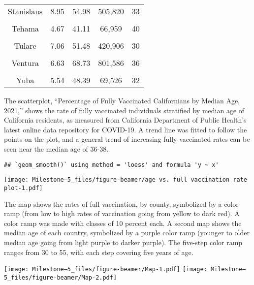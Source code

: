 \documentclass[
  ignorenonframetext,
]{beamer}
\begin{document}
\begin{frame}
\begin{table}
{\begin{tabular}[t]{ccccc}
Stanislaus & 8.95 & 54.98 & 505,820 & 33\\
\addlinespace
\cellcolor{gray!6}{Sutter} & \cellcolor{gray!6}{6.46} & \cellcolor{gray!6}{57.47} & \cellcolor{gray!6}{90,595} & \cellcolor{gray!6}{35}\\
Tehama & 4.67 & 41.11 & 66,959 & 40\\
\cellcolor{gray!6}{Trinity} & \cellcolor{gray!6}{6.01} & \cellcolor{gray!6}{42.55} & \cellcolor{gray!6}{12,260} & \cellcolor{gray!6}{49}\\
Tulare & 7.06 & 51.48 & 420,906 & 30\\
\cellcolor{gray!6}{Tuolumne} & \cellcolor{gray!6}{6.96} & \cellcolor{gray!6}{50.01} & \cellcolor{gray!6}{52,564} & \cellcolor{gray!6}{47}\\
\addlinespace
Ventura & 6.63 & 68.73 & 801,586 & 36\\
\cellcolor{gray!6}{Yolo} & \cellcolor{gray!6}{8.69} & \cellcolor{gray!6}{67.09} & \cellcolor{gray!6}{204,789} & \cellcolor{gray!6}{30}\\
Yuba & 5.54 & 48.39 & 69,526 & 32\\
\bottomrule
\end{tabular}}
\end{table}


\end{frame}

\begin{frame}[fragile]
The scatterplot, ``Percentage of Fully Vaccinated Californians by Median
Age, 2021,'' shows the rate of fully vaccinated individuals stratified
by median age of California residents, as measured from California
Department of Public Health's latest online data repository for
COVID-19. A trend line was fitted to follow the points on the plot, and
a general trend of increasing fully vaccinated rates can be seen near
the median age of 36-38.

\begin{verbatim}
## `geom_smooth()` using method = 'loess' and formula 'y ~ x'
\end{verbatim}

\texttt{[image: Milestone--5\_files/figure-beamer/age vs. full vaccination rate plot-1.pdf]}
\newpage 
\end{frame}

\begin{frame}
The map shows the rates of full vaccination, by county, symbolized by a
color ramp (from low to high rates of vaccination going from yellow to
dark red). A color ramp was made with classes of 10 percent each. A
second map shows the median age of each country, symbolized by a purple
color ramp (younger to older median age going from light purple to
darker purple). The five-step color ramp ranges from 30 to 55, with each
step covering five years of age.

\texttt{[image: Milestone--5\_files/figure-beamer/Map-1.pdf]}
\texttt{[image: Milestone--5\_files/figure-beamer/Map-2.pdf]}


\end{frame}
\end{document}
